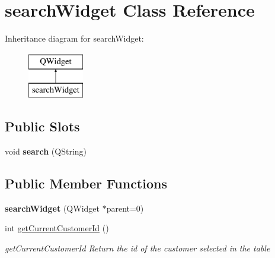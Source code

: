 \hypertarget{classsearchWidget}{\section{search\-Widget Class Reference}
\label{classsearchWidget}
}
Inheritance diagram for search\-Widget\-:\begin{figure}[H]
\begin{center}
\leavevmode
\includegraphics[height=2.000000cm]{d2/dfd/classsearchWidget}
\end{center}
\end{figure}
\subsection*{Public Slots}
\begin{DoxyCompactItemize}
\item 
\hypertarget{classsearchWidget_a01f311627fd5bdbc2886e2dbbe8d7fc7}{void {\bfseries search} (Q\-String)}\label{classsearchWidget_a01f311627fd5bdbc2886e2dbbe8d7fc7}

\end{DoxyCompactItemize}
\subsection*{Public Member Functions}
\begin{DoxyCompactItemize}
\item 
\hypertarget{classsearchWidget_a0c712bf4f3c2105319645ce97e23eba9}{{\bfseries search\-Widget} (Q\-Widget $\ast$parent=0)}\label{classsearchWidget_a0c712bf4f3c2105319645ce97e23eba9}

\item 
int \hyperlink{classsearchWidget_ac74ae97eb8c147c89edc3dec3decf174}{get\-Current\-Customer\-Id} ()
\begin{DoxyCompactList}\small\item\em get\-Current\-Customer\-Id Return the id of the customer selected in the table \end{DoxyCompactList}\end{DoxyCompactItemize}


